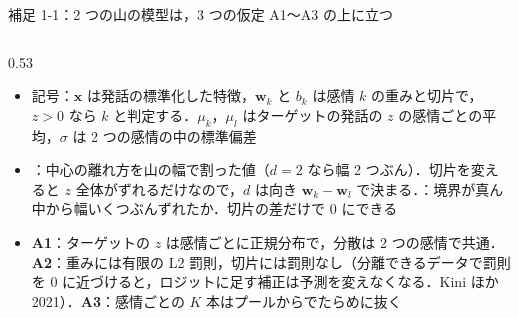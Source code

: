 \begin{frame}{補足 1-1：2 つの山の模型は，3 つの仮定 A1〜A3 の上に立つ}
\begin{columns}[T,onlytextwidth]
\begin{column}{0.53\textwidth}
\begin{itemize}
        \item 記号：$\mathbf{x}$ は発話の標準化した特徴，$\mathbf{w}_k$ と $b_k$ は感情 $k$ の重みと切片で，$z>0$ なら $k$ と判定する．$\mu_k$，$\mu_l$ はターゲットの発話の $z$ の感情ごとの平均，$\sigma$ は 2 つの感情の中の標準偏差
        \item {}：中心の離れ方を山の幅で割った値（$d=2$ なら幅 2 つぶん）．切片を変えると $z$ 全体がずれるだけなので，$d$ は向き $\mathbf{w}_k - \mathbf{w}_l$ で決まる．：境界が真ん中から幅いくつぶんずれたか．切片の差だけで 0 にできる
        \item \textbf{A1}：ターゲットの $z$ は感情ごとに正規分布で，分散は 2 つの感情で共通．\textbf{A2}：重みには有限の L2 罰則，切片には罰則なし（分離できるデータで罰則を 0 に近づけると，ロジットに足す補正は予測を変えなくなる．Kini ほか 2021）．\textbf{A3}：感情ごとの $K$ 本はプールからでたらめに抜く
      \end{itemize}
    \end{column}
  \end{columns}
\end{frame}

